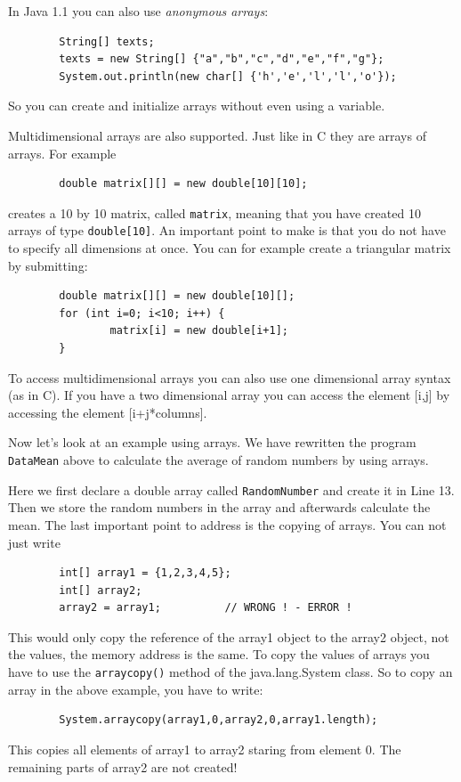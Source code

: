 In Java 1.1 you can also use \emph{anonymous arrays}:
\begin{verbatim}
        String[] texts;
        texts = new String[] {"a","b","c","d","e","f","g"};
        System.out.println(new char[] {'h','e','l','l','o'});
\end{verbatim}
So you can create and initialize arrays without even using a variable.

Multidimensional arrays are also supported. Just like in C they are
arrays of arrays. For example
\begin{verbatim}
        double matrix[][] = new double[10][10]; 
\end{verbatim}
creates a 10 by 10 matrix, called \verb|matrix|, 
meaning that you have created 10 arrays
of type \verb|double[10]|. An important point to make is that you
do not have to specify all dimensions at once. You can for example
create a triangular matrix by submitting:
\begin{verbatim}
        double matrix[][] = new double[10][];
        for (int i=0; i<10; i++) {
                matrix[i] = new double[i+1];
        } 
\end{verbatim}
To access multidimensional arrays you can also use one dimensional
array syntax (as in C). If you have a two dimensional array 
you can access the element [i,j] by accessing the element [i+j*columns]. 

Now let's look at an example using arrays. We have rewritten the program
\verb|DataMean| above to calculate the average of random 
numbers by using arrays.


Here we first declare a double array called \verb|RandomNumber| and
create it in Line 13. Then we store the random numbers in the array
and afterwards calculate the mean.
The last important point to address is the copying of arrays. 
You can not just write
\begin{verbatim}
        int[] array1 = {1,2,3,4,5};
        int[] array2;
        array2 = array1;          // WRONG ! - ERROR ! 
\end{verbatim}
This would only copy the reference of the array1 object to the array2
object, not the values, the memory address is the same. 
To copy the values of arrays you have to use the 
\verb|arraycopy()| method of the java.lang.System class. 
So to copy an array in the above example, you have to write:
\begin{verbatim}
        System.arraycopy(array1,0,array2,0,array1.length);
\end{verbatim}
This copies all elements of array1 to array2 staring from element 0. 
The remaining parts of array2 are not created!

